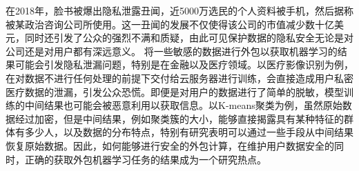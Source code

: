 在2018年，脸书被爆出隐私泄露丑闻，近5000万选民的个人资料被手机，然后据称被某政治咨询公司所使用。这一丑闻的发展不仅使得该公司的市值减少数十亿美元，同时还引发了公众的强烈不满和质疑，由此可见保护数据的隐私安全无论是对公司还是对用户都有深远意义。
将一些敏感的数据进行外包以获取机器学习的结果可能会引发隐私泄漏问题，特别是在金融以及医疗领域。以医疗影像识别为例，在对数据不进行任何处理的前提下交付给云服务器进行训练，会直接造成用户私密医疗数据的泄漏，引发公众恐慌。即便是对用户的数据进行了简单的脱敏，模型训练的中间结果也可能会被恶意利用以获取信息。以K-means聚类为例，虽然原始数据经过加密，但是中间结果，例如聚类簇的大小，能够直接揭露具有某种特征的群体有多少人，以及数据的分布特点，特别有研究表明可以通过一些手段从中间结果恢复原始数据\cite{liu2021when}。因此，如何能够进行安全的外包计算，在维护用户数据安全的同时，正确的获取外包机器学习任务的结果成为一个研究热点。


